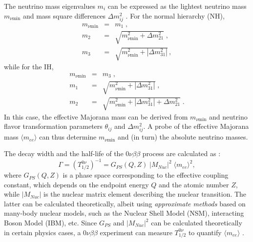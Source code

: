 The neutrino mass eigenvalues $m_i$ can be expressed as the lightest neutrino mass $m_{\nu \mathrm{min}}$ and mass square differences $\Delta m^2_{ij}$ \cite{suekane2015neutrino}. For the normal hierarchy (NH),
\begin{eqnarray*}
m_{\nu \mathrm{min}} &=& m_1 \; , \\
m_2 &=& \sqrt{m_{\nu \mathrm{min}}^2+\Delta m^2_{21}} \; , \\
m_3 &=& \sqrt{m_{\nu \mathrm{min}}^2+|\Delta m^2_{31}|} \, ,
\end{eqnarray*}
while for the IH, 
\begin{eqnarray*}
m_{\nu \mathrm{min}} &=& m_3 \; , \\
m_1 &=& \sqrt{m_{\nu \mathrm{min}}^2+|\Delta m^2_{31}|} \; , \\
m_2 &=& \sqrt{m_{\nu \mathrm{min}}^2+|\Delta m^2_{31}|+\Delta m^2_{21}} \; .
\end{eqnarray*}
In this case, the effective Majorana mass can be derived from $m_{\nu \mathrm{min}}$ and neutrino flavor transformation parameters $\theta_{ij}$ and $\Delta m^2_{ij}$. A probe of the effective Majorana mass $\langle m_{ee}\rangle$ can thus determine $m_{\nu \mathrm{min}}$ and (in turn) the absolute neutrino masses. 

The decay width and the half-life of the $0\nu\beta\beta$ process are calculated as \cite{suekane2015neutrino,zuber2020neutrino}:
\begin{equation}\label{eq:decayWidth0vbb}
\Gamma=(T^{0\nu}_{1/2})^{-1} = G_{PS}(Q,Z) \; |M_{Nuc}|^2 \; \langle m_{ee}\rangle^2, 
\end{equation}
where $G_{PS}(Q,Z)$ is a phase space corresponding to the effective coupling constant, which depends on the endpoint energy $Q$ and the atomic number $Z$, while $|M_{Nuc}|$ is the nuclear matrix element describing the nuclear transition. The latter can be calculated theoretically, albeit using {\em approximate methods} based on many-body nuclear models, such as the Nuclear Shell Model (NSM), interacting Boson Model (IBM), etc. Since $G_{PS}$ and $|M_{Nuc}|^2$ can be calculated theoretically in certain physics cases, a $0\nu\beta\beta$ experiment can measure $T^{0\nu}_{1/2}$ to quantify $\langle m_{ee}\rangle$ \cite{zuber2020neutrino,dolinski2019neutrinoless}.

